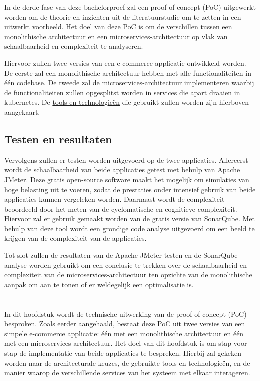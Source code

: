 In de derde fase van deze bachelorproef zal een proof-of-concept (PoC) uitgewerkt worden om de theorie en inzichten uit de literatuurstudie om te zetten in een uitwerkt voorbeeld. Het doel van deze PoC is om de verschillen tussen een monolithische architectuur en een microservices-architectuur op vlak van schaalbaarheid en complexiteit te analyseren.

Hiervoor zullen twee versies van een e-commerce applicatie ontwikkeld worden. De eerste zal een monolithische architectuur hebben met alle functionaliteiten in één codebase. De tweede zal de microservices-architectuur implementeren waarbij de functionaliteiten zullen opgesplitst worden in services die apart draaien in kubernetes. De \hyperref[tools_en_technologieën]{tools en technologieën} die gebruikt zullen worden zijn hierboven aangekaart.

\section{Testen en resultaten}

Vervolgens zullen er testen worden uitgevoerd op de twee applicaties. Allereerst wordt de schaalbaarheid van beide applicaties getest met behulp van Apache JMeter. Deze gratis open-source software maakt het mogelijk om simulaties van hoge belasting uit te voeren, zodat de prestaties onder intensief gebruik van beide applicaties kunnen vergeleken worden. Daarnaast wordt de complexiteit beoordeeld door het meten van de cyclomatische en cognitieve complexiteit. Hiervoor zal er gebruik gemaakt worden van de gratis versie van SonarQube. Met behulp van deze tool wordt een grondige code analyse uitgevoerd om een beeld te krijgen van de complexiteit van de applicaties.

Tot slot zullen de resultaten van de Apache JMeter testen en de SonarQube analyse worden gebruikt om een conclusie te trekken over de schaalbaarheid en complexiteit van de microservices-architectuur ten opzichte van de monolithische aanpak om aan te tonen of er weldegelijk een optimalisatie is.




\chapter{}%
\label{ch:uitwerking}

In dit hoofdstuk wordt de technische uitwerking van de proof-of-concept (PoC) besproken. Zoals eerder aangehaald, bestaat deze PoC uit twee versies van een simpele e-commerce applicatie: één met een monolithische architectuur en één met een microservices-architectuur. Het doel van dit hoofdstuk is om stap voor stap de implementatie van beide applicaties te bespreken. Hierbij zal gekeken worden naar de architecturale keuzes, de gebruikte tools en technologieën, en de manier waarop de verschillende services van het systeem met elkaar interageren.

